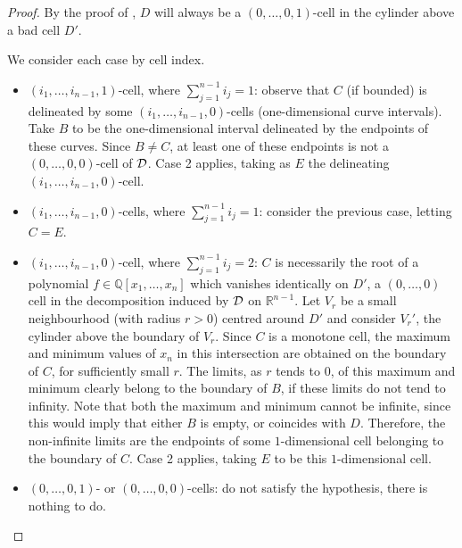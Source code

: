 \documentclass[
]{book}
\theoremstyle{definition}
\theoremstyle{definition}
\theoremstyle{definition}
\theoremstyle{definition}
\theoremstyle{remark}
\begin{document}
\begin{proof}

By the proof of \citep[Theorem 4.4]{lazard10}, \(D\) will always be a \((0,\ldots,0,1)\)-cell in the cylinder above a bad cell \(D'\).

We consider each case by cell index.

\begin{itemize}
\item
  \((i_1,\ldots,i_{n-1},1)\)-cell, where \(\sum_{j=1}^{n-1} i_j = 1\): observe that \(C\) (if bounded) is delineated by some \((i_1,\ldots,i_{n-1},0)\)-cells (one-dimensional curve intervals). Take \(B\) to be the one-dimensional interval delineated by the endpoints of these curves. Since \(B \neq C\), at least one of these endpoints is not a \((0,\ldots,0,0)\)-cell of \(\cal D\). Case 2 applies, taking as \(E\) the delineating \((i_1,\ldots,i_{n-1},0)\)-cell.
\item
  \((i_1,\ldots,i_{n-1},0)\)-cells, where \(\sum_{j=1}^{n-1} i_j = 1\): consider the previous case, letting \(C = E\).
\item
  \((i_1,\ldots,i_{n-1},0)\)-cell, where \(\sum_{j=1}^{n-1} i_j = 2\):
  \(C\) is necessarily the root of a polynomial \(f \in \mathbb{Q}[x_1,\ldots,x_n]\) which vanishes identically on \(D'\), a \((0,\ldots,0)\) cell in the decomposition induced by \(\cal D\) on \(\mathbb{R}^{n-1}\).
  Let \(V_r\) be a small neighbourhood (with radius \(r > 0\)) centred around \(D'\) and consider \(V_r'\), the cylinder above the boundary of \(V_r\). Since \(C\) is a monotone cell, the maximum and minimum values of \(x_n\) in this intersection are obtained on the boundary of \(C\), for sufficiently small \(r\). The limits, as \(r\) tends to \(0\), of this maximum and minimum clearly belong to the boundary of \(B\), if these limits do not tend to infinity. Note that both the maximum and minimum cannot be infinite, since this would imply that either \(B\) is empty, or coincides with \(D\). Therefore, the non-infinite limits are the endpoints of some \(1\)-dimensional cell belonging to the boundary of \(C\). Case 2 applies, taking \(E\) to be this \(1\)-dimensional cell.
\item
  \((0,\ldots,0,1)\)- or \((0,\ldots,0,0)\)-cells: do not satisfy the hypothesis, there is nothing to do.
\end{itemize}

\end{proof}
\end{document}
